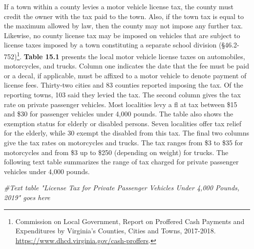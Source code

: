 \documentclass[
]{book}
\newenvironment{Shaded}{\begin{snugshade}}{\end{snugshade}}
\newcommand{\CommentTok}[1]{\textcolor[rgb]{0.56,0.35,0.01}{\textit{#1}}}
\begin{document}
\textbar{}
\textbar{} If a town within a county levies a motor vehicle license tax, the county must credit the owner with the tax paid to the town. Also, if the town tax is equal to the maximum allowed by law, then the county may not impose any further tax. Likewise, no county license tax may be imposed on vehicles that are subject to license taxes imposed by a town constituting a separate school division (§46.2-752)\footnote{Commission on Local Government, Report on Proffered Cash Payments and Expenditures by Virginia's Counties, Cities and Towns, 2017-2018. \url{https://www.dhcd.virginia.gov/cash-proffers}.}.
\textbar{}
\textbar{} \textbf{Table 15.1} presents the local motor vehicle license taxes on automobiles, motorcycles, and trucks. Column one indicates the date that the fee must be paid or a decal, if applicable, must be affixed to a motor vehicle to denote payment of license fees. Thirty-two cities and 83 counties reported imposing the tax. Of the reporting towns, 103 said they levied the tax. The second column gives the tax rate on private passenger vehicles. Most localities levy a fl at tax between \$15 and \$30 for passenger vehicles under 4,000 pounds. The table also shows the exemption status for elderly or disabled persons. Seven localities offer tax relief for the elderly, while 30 exempt the disabled from this tax. The final two columns give the tax rates on motorcycles and trucks. The tax ranges from \$3 to \$35 for motorcycles and from \$3 up to \$250 (depending on weight) for trucks.
\textbar{}
\textbar{} The following text table summarizes the range of tax charged for private passenger vehicles under 4,000 pounds.

\begin{Shaded}
\begin{Highlighting}[]
\CommentTok{\#Text table "License Tax for Private Passenger Vehicles Under 4,000 Pounds, 2019" goes here}
\end{Highlighting}
\end{Shaded}
\end{document}
